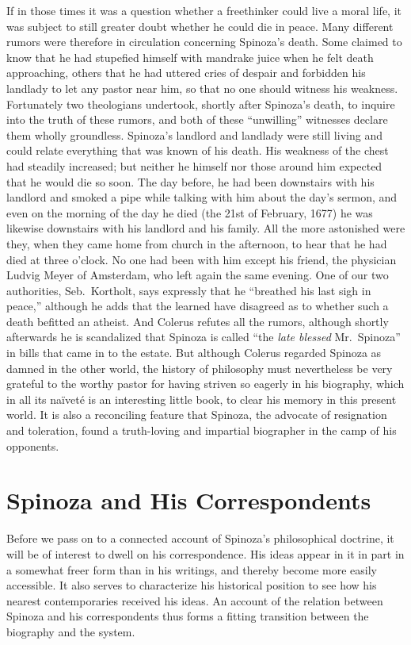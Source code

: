\documentclass[12pt]{book}
\newcommand{\opage}[1]{\marginnote{\footnotesize\textit{[#1]}}}
\begin{document}
If in those times it was a question whether a freethinker could live a moral life, it
was subject to still greater doubt whether he could die in peace. Many different rumors
were therefore in circulation concerning Spinoza's death. Some claimed to know that he
had stupefied himself with mandrake juice when he felt death approaching, others that
he had uttered cries of despair and forbidden his landlady to let any pastor near him,
so that no one should witness his weakness. Fortunately two theologians undertook,
shortly after Spinoza's death, to inquire into the truth of these rumors, and both of
these ``unwilling'' witnesses declare them wholly groundless. Spinoza's landlord and
landlady %
were still living and could relate everything that was known of his death. His
weakness of the chest had steadily increased; but neither he himself nor those around
him expected that he would die so soon. The day before, he had been downstairs with
his landlord and smoked a pipe while talking with him about the day's sermon, and even
on the morning of the day he died (the 21st of February, 1677) he was likewise
downstairs with his landlord and his family. All the more astonished were they, when
they came home from church in the afternoon, to hear \opage{43}that he had died at
three o'clock. No one had been with him except his friend, the physician Ludvig Meyer
of Amsterdam, who left again the same evening. One of our two authorities, Seb.\
Kortholt, says expressly that he ``breathed his last sigh in peace,'' although he adds
that the learned have disagreed as to whether such a death befitted an atheist. And
Colerus refutes all the rumors, although shortly afterwards he is scandalized that
Spinoza is called ``the \emph{late blessed} Mr.\ Spinoza'' in bills that came in to the
estate. But although Colerus regarded Spinoza as damned in the other world, the
history of philosophy must nevertheless be very grateful to the worthy pastor for
having striven so eagerly in his biography, which in all its naïveté is an interesting
little book, to clear his memory in this present world. It is also a reconciling
feature that Spinoza, the advocate of resignation and toleration, found a
truth-loving and impartial biographer in the camp of his opponents.

\chapter*{Spinoza and His Correspondents}
\opage{44}Before we pass on to a connected account of Spinoza's philosophical doctrine, it
will be of interest to dwell on his correspondence. His ideas appear in it in part in
a somewhat freer form than in his writings, and thereby become more easily
accessible. It also serves to characterize his historical position to see how his
nearest contemporaries received his ideas. An account of the relation between Spinoza
and his correspondents thus forms a fitting transition between the biography and the
system.
\end{document}
